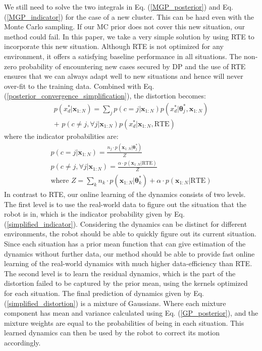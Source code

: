 We still need to solve the two integrals in Eq. (\ref{MGP_posterior}) and Eq. (\ref{MGP_indicator}) for the case of a new cluster.
This can be hard even with the Monte Carlo sampling. 
If our MC prior does not cover this new situation, our method could fail.
In this paper, we take a very simple solution by using RTE to incorporate this new situation.
Although RTE is not optimized for any environment, it offers a satisfying baseline performance in all situations.
The non-zero probability of encountering new cases secured by DP and the use of RTE ensures that we can always adapt well to new situations and hence will never over-fit to the training data.
Combined with Eq. (\ref{posterior_convergence_simplification}), the distortion becomes:
\begin{equation}
\begin{gathered}
p(x^*_d|\bm{x}_{1:N}) 
= \sum_j p(c=j| \bm{x}_{1:N}) p(x^*_d|\bm{\theta}^*_j, \bm{x}_{1:N})
\\
+ \,\, p(c \neq j, \forall j|\bm{x}_{1:N})  p(x^*_d|\bm{x}_{1:N}, \text{RTE})
\end{gathered}
\label{simplified_distortion}
\end{equation}
where the indicator probabilities are:
\begin{equation}
\begin{gathered}
p(c=j| \bm{x}_{1:N}) 
= \frac{n_j \cdot p(\bm{x}_{1:N}|\bm{\theta}^*_j)
}{Z}
\\ 
p(c \neq j, \forall j| \bm{x}_{1:N})
= \frac{\alpha \cdot p(\bm{x}_{1:N}|\text{RTE})
}{Z}
\\ \text{where }
Z = \sum_k n_k \cdot p(\bm{x}_{1:N}|\bm{\theta}^*_k) + \alpha \cdot p(\bm{x}_{1:N}|\text{RTE})
\end{gathered}
\label{simplified_indicator}
\end{equation}
In contrast to RTE, our online learning of the dynamics consists of two levels.
The first level is to use the real-world data to figure out the situation that the robot is in, which is the indicator probability given by Eq. (\ref{simplified_indicator}).
Considering the dynamics can be distinct for different environments, the robot should be able to quickly figure out its current situation.
Since each situation has a prior mean function that can give estimation of the dynamics without further data, our method should be able to provide fast online learning of the real-world dynamics with much higher data-efficiency than RTE.
The second level is to learn the residual dynamics, which is the part of the distortion failed to be captured by the prior mean, using the kernels optimized for each situation.
The final prediction of dynamics given by Eq. (\ref{simplified_distortion}) is a mixture of Gaussians.
Where each mixture component has mean and variance calculated using Eq. (\ref{GP_posterior}), and the mixture weights are equal to the probabilities of being in each situation.
This learned dynamics can then be used by the robot to correct its motion accordingly.